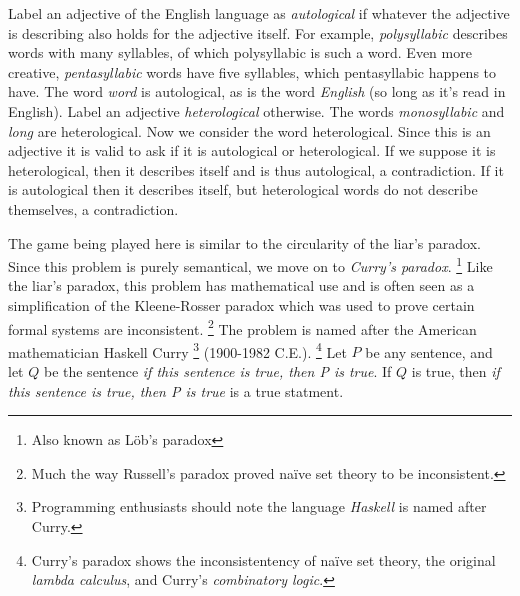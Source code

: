         Label an adjective of the English language as \textit{autological} if
        whatever the adjective is describing also holds for the adjective
        itself. For example, \textit{polysyllabic} describes words with many
        syllables, of which polysyllabic is such a word. Even more creative,
        \textit{pentasyllabic} words have five syllables, which pentasyllabic
        happens to have. The word \textit{word} is autological, as is the word
        \textit{English} (so long as it's read in English). Label an adjective
        \textit{heterological} otherwise. The words \textit{monosyllabic} and
        \textit{long} are heterological. Now we consider the word heterological.
        Since this is an adjective it is valid to ask if it is autological or
        heterological. If we suppose it is heterological, then it describes
        itself and is thus autological, a contradiction. If it is autological
        then it describes itself, but heterological words do not describe
        themselves, a contradiction.
        \par\hfill\par
        The game  being played here is similar to the circularity of the
        liar's paradox. Since this problem is purely semantical, we move on to
        \textit{Curry's paradox}.%
        \footnote{%
            Also known as L\"{o}b's paradox%
        }
        Like the liar's paradox, this problem has mathematical use and is often
        seen as a simplification of the Kleene-Rosser paradox%
         which was
        used to prove certain formal systems are inconsistent.%
        \footnote{%
            Much the way Russell's paradox proved na\"{i}ve set theory to
            be inconsistent.
        }
        The problem is named after the American mathematician
        Haskell Curry%
        \footnote{%
            Programming enthusiasts should note the language
            \textit{Haskell} is named after Curry.
        }
        (1900-1982 C.E.).%
        \footnote{%
            Curry's paradox shows the inconsistentency of na\"{i}ve set theory,
            the original \textit{lambda calculus}, and Curry's
            \textit{combinatory logic}.
        }
        Let $P$ be any sentence, and let $Q$ be the sentence
        \textit{if this sentence is true, then P is true}. If $Q$ is true, then
        \textit{if this sentence is true, then P is true} is a true statment.
